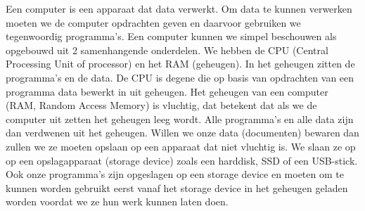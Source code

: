Een computer is een apparaat dat data verwerkt. Om data te kunnen verwerken moeten we de computer opdrachten geven en daarvoor gebruiken we tegenwoordig programma's. Een computer kunnen we simpel beschouwen als opgebouwd uit 2 samenhangende onderdelen. We hebben de CPU (Central Processing Unit of processor) en het RAM (geheugen). In het geheugen zitten de programma's en de data. De CPU is degene die op basis van opdrachten van een programma data bewerkt in uit geheugen. Het geheugen van een computer (RAM, Random Access Memory) is vluchtig, dat betekent dat als we de computer uit zetten het geheugen leeg wordt. Alle programma's en alle data zijn dan verdwenen uit het geheugen. Willen we onze data (documenten) bewaren dan zullen we ze moeten opslaan op een apparaat dat niet vluchtig is. We slaan ze op op een opslagapparaat (storage device) zoals een harddisk, SSD of een USB-stick. Ook onze programma's zijn opgeslagen op een storage device en moeten om te kunnen worden gebruikt eerst vanaf het storage device in het geheugen geladen worden voordat we ze hun werk kunnen laten doen.


